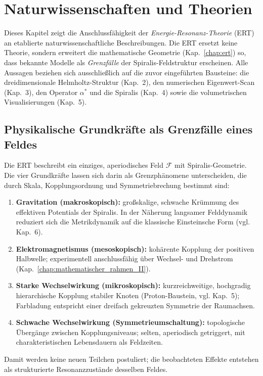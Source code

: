 \chapter{Naturwissenschaften und Theorien}
\label{chap:naturwissenschaften}

Dieses Kapitel zeigt die Anschlussfähigkeit der \emph{Energie-Resonanz-Theorie} (ERT) an etablierte naturwissenschaftliche Beschreibungen. 
Die ERT ersetzt keine Theorie, sondern erweitert die mathematische Geometrie (Kap.~\ref{chap:ert}) so, dass bekannte Modelle als \emph{Grenzfälle} der Spiralis-Feldstruktur erscheinen. 
Alle Aussagen beziehen sich ausschließlich auf die zuvor eingeführten Bausteine: die dreidimensionale Helmholtz-Struktur (Kap.~2), den numerischen Eigenwert-Scan (Kap.~3), den Operator \(\alpha^*\) und die Spiralis (Kap.~4) sowie die volumetrischen Visualisierungen (Kap.~5).

\section{Physikalische Grundkräfte als Grenzfälle eines Feldes}
\label{sec:grundkraefte}
Die ERT beschreibt ein einziges, aperiodisches Feld \(\mathcal{F}\) mit Spiralis-Geometrie. 
Die vier Grundkräfte lassen sich darin als Grenzphänomene unterscheiden, die durch Skala, Kopplungsordnung und Symmetriebrechung bestimmt sind:
\begin{enumerate}
  \item \textbf{Gravitation (makroskopisch):} großskalige, schwache Krümmung des effektiven Potentials der Spiralis. 
        In der Näherung langsamer Felddynamik reduziert sich die Metrikdynamik auf die klassische Einsteinsche Form (vgl. Kap.~6).
  \item \textbf{Elektromagnetismus (mesoskopisch):} kohärente Kopplung der positiven Halbwelle; experimentell anschlussfähig über Wechsel- und Drehstrom (Kap.~\ref{chap:mathematischer_rahmen_II}).
  \item \textbf{Starke Wechselwirkung (mikroskopisch):} kurzreichweitige, hochgradig hierarchische Kopplung stabiler Knoten (Proton-Baustein, vgl. Kap.~5); Farbladung entspricht einer dreifach gekreuzten Symmetrie der Raumachsen.
  \item \textbf{Schwache Wechselwirkung (Symmetrieumschaltung):} topologische Übergänge zwischen Kopplungsniveaus; selten, aperiodisch getriggert, mit charakteristischen Lebensdauern als Feldzeiten.
\end{enumerate}
Damit werden keine neuen Teilchen postuliert; die beobachteten Effekte entstehen als strukturierte Resonanzzustände desselben Feldes.

